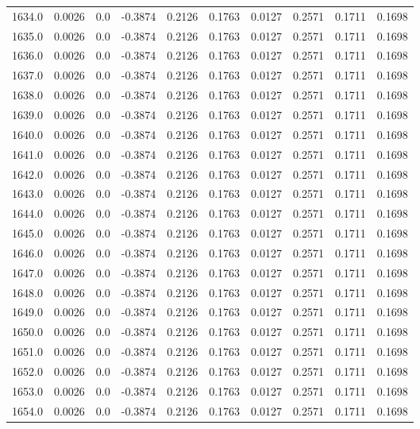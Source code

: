 \begin{longtable}{lrrrrrrrrr}
1634.0 & 0.0026 & 0.0 & -0.3874 & 0.2126 & 0.1763 & 0.0127 & 0.2571 & 0.1711 & 0.1698 \\
1635.0 & 0.0026 & 0.0 & -0.3874 & 0.2126 & 0.1763 & 0.0127 & 0.2571 & 0.1711 & 0.1698 \\
1636.0 & 0.0026 & 0.0 & -0.3874 & 0.2126 & 0.1763 & 0.0127 & 0.2571 & 0.1711 & 0.1698 \\
1637.0 & 0.0026 & 0.0 & -0.3874 & 0.2126 & 0.1763 & 0.0127 & 0.2571 & 0.1711 & 0.1698 \\
1638.0 & 0.0026 & 0.0 & -0.3874 & 0.2126 & 0.1763 & 0.0127 & 0.2571 & 0.1711 & 0.1698 \\
1639.0 & 0.0026 & 0.0 & -0.3874 & 0.2126 & 0.1763 & 0.0127 & 0.2571 & 0.1711 & 0.1698 \\
1640.0 & 0.0026 & 0.0 & -0.3874 & 0.2126 & 0.1763 & 0.0127 & 0.2571 & 0.1711 & 0.1698 \\
1641.0 & 0.0026 & 0.0 & -0.3874 & 0.2126 & 0.1763 & 0.0127 & 0.2571 & 0.1711 & 0.1698 \\
1642.0 & 0.0026 & 0.0 & -0.3874 & 0.2126 & 0.1763 & 0.0127 & 0.2571 & 0.1711 & 0.1698 \\
1643.0 & 0.0026 & 0.0 & -0.3874 & 0.2126 & 0.1763 & 0.0127 & 0.2571 & 0.1711 & 0.1698 \\
1644.0 & 0.0026 & 0.0 & -0.3874 & 0.2126 & 0.1763 & 0.0127 & 0.2571 & 0.1711 & 0.1698 \\
1645.0 & 0.0026 & 0.0 & -0.3874 & 0.2126 & 0.1763 & 0.0127 & 0.2571 & 0.1711 & 0.1698 \\
1646.0 & 0.0026 & 0.0 & -0.3874 & 0.2126 & 0.1763 & 0.0127 & 0.2571 & 0.1711 & 0.1698 \\
1647.0 & 0.0026 & 0.0 & -0.3874 & 0.2126 & 0.1763 & 0.0127 & 0.2571 & 0.1711 & 0.1698 \\
1648.0 & 0.0026 & 0.0 & -0.3874 & 0.2126 & 0.1763 & 0.0127 & 0.2571 & 0.1711 & 0.1698 \\
1649.0 & 0.0026 & 0.0 & -0.3874 & 0.2126 & 0.1763 & 0.0127 & 0.2571 & 0.1711 & 0.1698 \\
1650.0 & 0.0026 & 0.0 & -0.3874 & 0.2126 & 0.1763 & 0.0127 & 0.2571 & 0.1711 & 0.1698 \\
1651.0 & 0.0026 & 0.0 & -0.3874 & 0.2126 & 0.1763 & 0.0127 & 0.2571 & 0.1711 & 0.1698 \\
1652.0 & 0.0026 & 0.0 & -0.3874 & 0.2126 & 0.1763 & 0.0127 & 0.2571 & 0.1711 & 0.1698 \\
1653.0 & 0.0026 & 0.0 & -0.3874 & 0.2126 & 0.1763 & 0.0127 & 0.2571 & 0.1711 & 0.1698 \\
1654.0 & 0.0026 & 0.0 & -0.3874 & 0.2126 & 0.1763 & 0.0127 & 0.2571 & 0.1711 & 0.1698 \\

\end{longtable}
